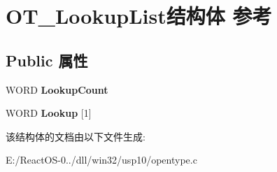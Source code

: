 \hypertarget{struct_o_t___lookup_list}{}\section{O\+T\+\_\+\+Lookup\+List结构体 参考}
\label{struct_o_t___lookup_list}
\subsection*{Public 属性}
\begin{DoxyCompactItemize}
\item 
\mbox{\label{struct_o_t___lookup_list_abf0f2962e62a157a7c427c0db8b1c809}} 
W\+O\+RD {\bfseries Lookup\+Count}
\item 
\mbox{\label{struct_o_t___lookup_list_aaccf00a274287059845e3d06918290bf}} 
W\+O\+RD {\bfseries Lookup} \mbox{[}1\mbox{]}
\end{DoxyCompactItemize}


该结构体的文档由以下文件生成\+:\begin{DoxyCompactItemize}
\item 
E\+:/\+React\+O\+S-\/0../dll/win32/usp10/opentype.\+c\end{DoxyCompactItemize}
